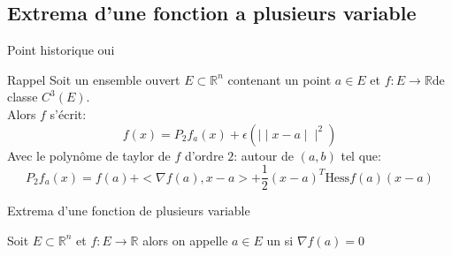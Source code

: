 \subsection{Extrema d'une fonction a plusieurs variable}


\begin{parag}{Point historique}
    oui
\end{parag}
\begin{parag}{Rappel}
    Soit un ensemble ouvert $E \subset \mathbb{R}^n$ contenant un point $a \in E$ et $f : E \to \mathbb{R}$de classe $C^3\left(E\right)$.\\
    Alors $f$ s'écrit:
    \begin{equation} f\left(x\right) = P_2f_a\left(x\right) + \epsilon\left( \mid \mid x - a \mid \mid^2\right) \end{equation}
    Avec le polynôme de taylor de $f$ d'ordre $2$: autour de $\left(a, b\right)$ tel que:
    \begin{equation} P_2f_a\left(x\right) = f\left(a\right) + < \nabla f\left(a\right), x - a> + \frac{1}{2}\left(x-a\right)^T \text{Hess}f\left(a\right)\left(x-a\right) \end{equation}
\end{parag}
\begin{parag}{Extrema d'une fonction de plusieurs variable}
    \begin{definition}
    Soit $E \subset \mathbb{R}^n$ et $f: E \to \mathbb{R}$ alors on appelle $a \in E$ un  si $\nabla f\left(a\right) = 0$
    \end{definition}
    
\end{parag}
